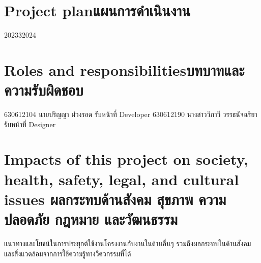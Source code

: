 \section{\ifenglish Project plan\else แผนการดำเนินงาน\fi}

\begin{plan}{6}{2023}{3}{2024}
\end{plan}

\section{\ifenglish Roles and responsibilities\else บทบาทและความรับผิดชอบ\fi}
630612104 นายปริญญา ม่วงรอด รับหน้าที่ Developer
630612190 นางสาววิภาวี วรรธนัจฉริยา รับหน้าที่ Designer
\section{\ifenglish%
Impacts of this project on society, health, safety, legal, and cultural issues
\else%
ผลกระทบด้านสังคม สุขภาพ ความปลอดภัย กฎหมาย และวัฒนธรรม
\fi}

แนวทางและโยชน์ในการประยุกต์ใช้งานโครงงานกับงานในด้านอื่นๆ รวมถึงผลกระทบในด้านสังคมและสิ่งแวดล้อมจากการใช้ความรู้ทางวิศวกรรมที่ได้
